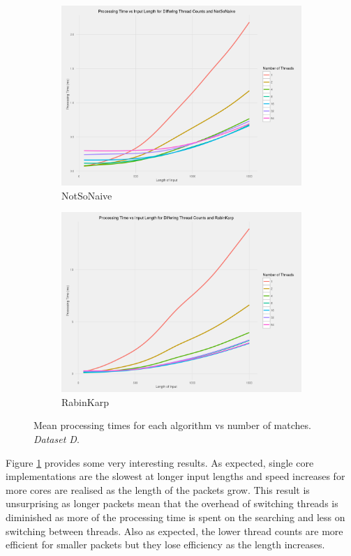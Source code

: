 \documentclass[11pt]{article}
\begin{document}
\begin{figure}[!htb]
\begin{subfigure}[b]{0.48\textwidth}
      \includegraphics[width=\textwidth]{images/scatter_elapsed_vs_input_length_many_cores_NotSoNaive}
      \caption{NotSoNaive}
  \end{subfigure}
  \begin{subfigure}[b]{0.48\textwidth}
      \includegraphics[width=\textwidth]{images/scatter_elapsed_vs_input_length_many_cores_Rabinkarp}
      \caption{RabinKarp}
  \end{subfigure}
  \caption{Mean processing times for each algorithm vs number of matches. \textit{Dataset D}.}
  \label{figure-processingtimevsinputlengthdifferentcores}
\end{figure}

Figure \ref{figure-processingtimevsinputlengthdifferentcores} provides some very interesting results. As expected, single core implementations are the slowest at longer input lengths and speed increases for more cores are realised as the length of the packets grow. This result is unsurprising as longer packets mean that the overhead of switching threads is diminished as more of the processing time is spent on the searching and less on switching between threads. Also as expected, the lower thread counts are more efficient for smaller packets but they lose efficiency as the length increases. 
\end{document}
